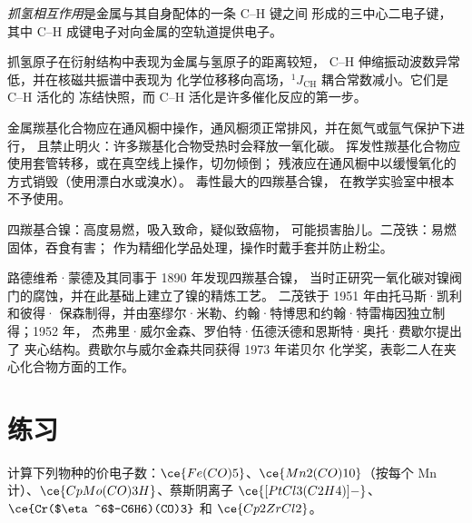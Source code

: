 \begin{definition}[抓氢相互作用]\label{def:b3:organometallic-bonding:agostic}
\emph{抓氢相互作用}是金属与其自身配体的一条 C--H 键之间
形成的三中心二电子键，
其中 C--H 成键电子对向金属的空轨道提供电子。
\end{definition}

抓氢原子在衍射结构中表现为金属与氢原子的距离较短，
C--H 伸缩振动波数异常低，并在核磁共振谱中表现为
化学位移移向高场，$^1J_{\mathrm{CH}}$ 耦合常数减小。它们是 C--H 活化的
冻结快照，而 C--H 活化是许多催化反应的第一步。

\begin{inthelab}[金属羰基化合物的操作]
金属羰基化合物应在通风橱中操作，通风橱须正常排风，并在氮气或氩气保护下进行，
且禁止明火：许多羰基化合物受热时会释放一氧化碳。
挥发性羰基化合物应使用套管转移，或在真空线上操作，切勿倾倒；
残液应在通风橱中以缓慢氧化的方式销毁（使用漂白水或溴水）。
毒性最大的四羰基合镍，
在教学实验室中根本不予使用。
\end{inthelab}

\begin{safety}{}
四羰基合镍：高度易燃，吸入致命，疑似致癌物，
可能损害胎儿。二茂铁：易燃固体，吞食有害；
作为精细化学品处理，操作时戴手套并防止粉尘。
\end{safety}

\begin{history}[蒙德的羰基化合物与夹心结构]
路德维希·蒙德及其同事于 1890 年发现四羰基合镍，
当时正研究一氧化碳对镍阀门的腐蚀，并在此基础上建立了镍的精炼工艺。
二茂铁于 1951 年由托马斯·凯利和彼得·
保森制得，并由塞缪尔·米勒、约翰·特博思和约翰·特雷梅因独立制得；1952 年，
杰弗里·威尔金森、罗伯特·伍德沃德和恩斯特·奥托·费歇尔提出了
夹心结构。费歇尔与威尔金森共同获得 1973 年诺贝尔
化学奖，表彰二人在夹心化合物方面的工作。
\end{history}

\section{练习}

\begin{exercise}[$\star$]\label{exo:b3:organometallic-bonding:1}
计算下列物种的价电子数：$\ce{Fe(CO)5}$、$\ce{Mn2(CO)10}$（按每个 Mn 计）、$\ce{CpMo(CO)3H}$、蔡斯阴离子
$\ce{[PtCl3(C2H4)]-}$、$\ce{Cr($\eta^6$-C6H6)(CO)3}$ 和 $\ce{Cp2ZrCl2}$。
\end{exercise}

